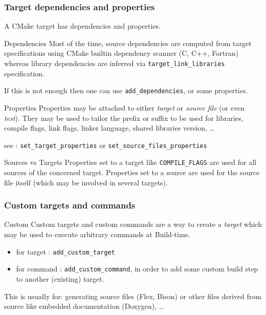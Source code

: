 \documentclass[compress,slidestop,table
              ]
               {beamer}
\begin{document}
\begin{frame}
\frametitle{Target dependencies and properties}
A CMake target has \alert{dependencies} and \alert{properties}.
\begin{block}{Dependencies}
Most of the time, source dependencies are computed from target specifications
using CMake builtin dependency scanner (C, C++, Fortran)
whereas library dependencies
are inferred via \lstinline!target_link_libraries! specification.
\end{block}
If this is not enough then one can use \lstinline!add_dependencies!,
or some properties.
\begin{block}{Properties}
Properties may be attached to either \emph{target} or \emph{source file}
(or even \emph{test}).
They may be used to tailor the prefix or suffix to be used for libraries,
compile flags, link flags, linker language, shared libraries version,
\ldots
\end{block}
\vspace*{-0.3cm}
see : \lstinline!set_target_properties! or \lstinline!set_source_files_properties!
\vspace*{-0.3cm}
\begin{alertblock}{Sources vs Targets}
Properties set to a target like \lstinline!COMPILE_FLAGS! are used
for all sources of the concerned target. Properties set to a source
are used for the source file itself (which may be involved in several targets).
\end{alertblock}
\end{frame}

\begin{frame}[fragile]
\frametitle{Custom targets and commands}
\begin{block}{Custom}
Custom targets and custom commands are a way to create a \emph{target}
which may be used to execute arbitrary commands at \alert{Build-time}.
\begin{itemize}
\item for target  : \lstinline!add_custom_target!
\item for command : \lstinline!add_custom_command!, in order to add some
custom build step to another (existing) target.
\end{itemize}
\end{block}
This is usually for: generating source files (Flex, Bison) or
other files derived from source like embedded documentation (Doxygen), \ldots
\end{frame}
\end{document}
